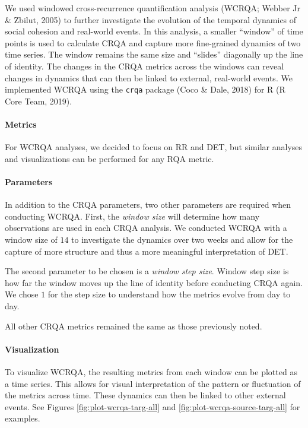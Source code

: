 \documentclass[
  english,
  man]{apa6}
\let\oldparagraph\paragraph
\renewcommand{\paragraph}[1]{\oldparagraph{#1}\mbox{}}
\begin{document}
We used windowed cross-recurrence quantification analysis (WCRQA; Webber Jr \& Zbilut, 2005) to further investigate the evolution of the temporal
dynamics of social cohesion and real-world events. In this analysis, a smaller
\enquote{window} of time points is used to calculate CRQA and capture more fine-grained
dynamics of two time series. The window remains the same size and \enquote{slides}
diagonally up the line of identity. The changes in the CRQA metrics across the
windows can reveal changes in dynamics that can then be linked to external,
real-world events. We implemented WCRQA using the \texttt{crqa} package (Coco \& Dale, 2018) for R
(R Core Team, 2019).

\hypertarget{metrics-1}{%
\paragraph{Metrics}\label{metrics-1}}

For WCRQA analyses, we decided to focus on RR and DET, but similar analyses and
visualizations can be performed for any RQA metric.

\hypertarget{parameters-1}{%
\paragraph{Parameters}\label{parameters-1}}

In addition to the CRQA parameters, two other parameters are required when
conducting WCRQA. First, the \emph{window size} will determine how many observations
are used in each CRQA analysis. We conducted WCRQA with a window size of \(14\) to
investigate the dynamics over two weeks and allow for the capture of more
structure and thus a more meaningful interpretation of DET.

The second parameter to be chosen is a \emph{window step size}. Window step size is
how far the window moves up the line of identity before conducting CRQA again.
We chose \(1\) for the step size to understand how the metrics evolve from day to
day.

All other CRQA metrics remained the same as those previously noted.

\hypertarget{visualization-1}{%
\paragraph{Visualization}\label{visualization-1}}

To visualize WCRQA, the resulting metrics from each window can be plotted as a
time series. This allows for visual interpretation of the pattern or fluctuation
of the metrics across time. These dynamics can then be linked to other external
events. See Figures \ref{fig:plot-wcrqa-targ-all} and
\ref{fig:plot-wcrqa-source-targ-all} for examples.
\end{document}
